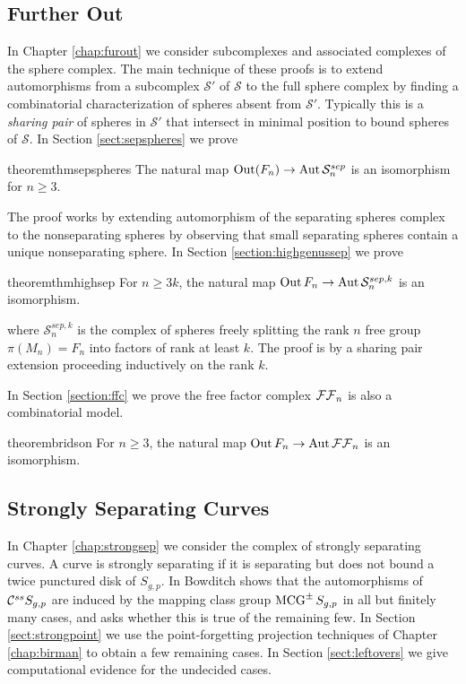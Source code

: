 \subsection{Further Out}

In Chapter \ref{chap:furout}
we consider subcomplexes and associated complexes of the sphere complex.
The main technique of these proofs is to
extend automorphisms from a subcomplex $\mathcal S'$ of $\mathcal S$ to the full sphere complex
by finding a combinatorial characterization of spheres absent from $\mathcal S'$.
Typically this is a \emph{sharing pair} of spheres in $\mathcal S'$
 that intersect in minimal position to
 bound spheres of $\mathcal S$.
 In Section
 \ref{sect:sepspheres} we prove
 \begin{restatable}{theorem}{thmsepspheres}
   The natural map $\operatorname{Out} (F_n) \to \operatorname{Aut} \mathcal S^{sep}_n $
   is an isomorphism for $n \geq 3$.
   \label{thm:sep}
 \end{restatable}
 The proof works by extending automorphism of the separating spheres complex to the nonseparating spheres by observing that
 small separating spheres contain a unique nonseparating sphere.
In Section
 \ref{section:highgenussep}
 we prove
 \begin{restatable}{theorem}{thmhighsep}
   \label{thm:highsep}
   For  $n\geq 3k$,
   the natural map
    $\operatorname{Out} F_n \to \operatorname{Aut}  \mathcal S^{sep,k}_n$
    is an isomorphism.
 \end{restatable}
 where $\mathcal S^{sep,k}_n$ is the complex of spheres freely splitting
 the rank $n$ free group $\pi(M_n)=F_n$ into factors of rank at least $k$.
 The proof is by a sharing pair extension proceeding inductively on the rank $k$.

 In Section \ref{section:ffc}
 we prove the free factor complex ${ \mathcal {FF}_n }$ is also a combinatorial model.
 \begin{restatable}{theorem}{bridson}
   For  $n\geq 3$,
   the natural map
    $\operatorname{Out} F_n \to \operatorname{Aut}  { \mathcal {FF}_n }$
    is an isomorphism.
    \label{thm:bridson}
 \end{restatable}


\subsection{Strongly Separating Curves}

In Chapter \ref{chap:strongsep} we consider the
complex of strongly separating curves.
A curve is strongly separating if it is separating but does not bound a twice punctured disk of $S_{g,p}$.
In \cite{bowditch} Bowditch shows that the automorphisms of
$ \mathcal C^{{ss}}  S_{g,p}$ are induced by the mapping class group $\operatorname{MCG}^\pm S_{g,p}$ in all but finitely many cases, and asks whether this is true of the remaining few.
In Section \ref{sect:strongpoint} we use the point-forgetting
projection techniques of Chapter \ref{chap:birman} to obtain a few remaining cases.
In Section \ref{sect:leftovers} we give computational evidence for the undecided cases.
